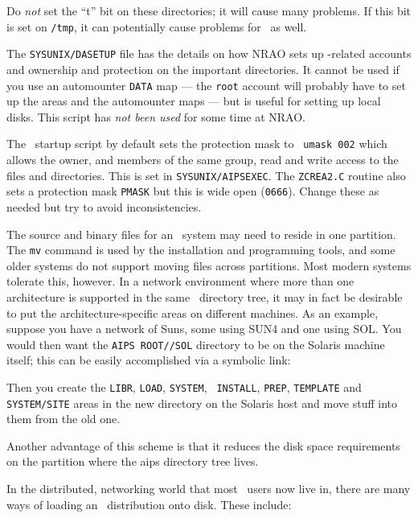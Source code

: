 Do {\it not\/} set the ``t'' bit on these directories; it will cause
many problems.  If this bit is set on {\tt /tmp}, it can potentially
cause problems for \AIPS\ as well.

The {\tt\dol SYSUNIX/DASETUP} file has the details on how NRAO sets up
\AIPS-related accounts and ownership and protection on the important
directories.  It cannot be used if you use an automounter {\tt DATA}
map --- the {\tt root} account will probably have to set up the areas
and the automounter maps --- but is useful for setting up local disks.
This script has {\it not been used\/} for some time at NRAO.

The \AIPS\ startup script by default sets the protection mask to {\tt
umask 002} which allows the owner, and members of the same group, read
and write access to the files and directories.  This is set in
{\tt\dol SYSUNIX/AIPSEXEC}.  The {\tt ZCREA2.C} routine also sets a
protection mask {\tt PMASK} but this is wide open ({\tt 0666}).
Change these as needed but try to avoid inconsistencies.

The source and binary files for an \AIPS\ system may need to reside in
one partition.  The {\tt mv} command is used by the installation and
programming tools, and some older systems do not support moving files
across partitions.  Most modern systems tolerate this, however.  In a
network environment where more than one architecture is supported in the
same \AIPS\ directory tree, it may in fact be desirable to put the
architecture-specific areas on different machines.  As an example,
suppose you have a network of Suns, some using SUN4 and one using SOL.
You would then want the {\tt\dol AIPS ROOT/\thisver/SOL} directory to be
on the Solaris machine itself; this can be easily accomplished via a
symbolic link:\medskip

\medskip

\noindent Then you create the {\tt LIBR}, {\tt LOAD}, {\tt SYSTEM}, {\tt
INSTALL}, {\tt PREP}, {\tt TEMPLATE} and {\tt SYSTEM/\dol SITE} areas in
the new directory on the Solaris host and move stuff into them from the
old one.

Another advantage of this scheme is that it reduces the disk space
requirements on the partition where the aips directory tree lives.

\medskip{}

In the distributed, networking world that most \AIPS\ users now live
in, there are many ways of loading an \AIPS\ distribution onto disk.
These include:\medskip

